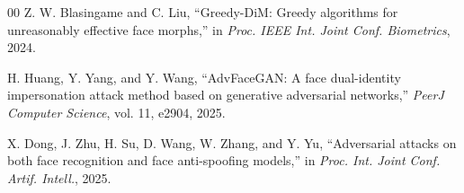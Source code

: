 \documentclass[conference]{IEEEtran}
\begin{document}
\begin{thebibliography}{00}
 Z. W. Blasingame and C. Liu, ``Greedy-DiM: Greedy
algorithms for unreasonably effective face morphs,'' in \emph{Proc. IEEE Int.
Joint Conf. Biometrics}, 2024.

 H. Huang, Y. Yang, and Y. Wang, ``AdvFaceGAN: A face
dual-identity impersonation attack method based on generative adversarial
networks,'' \emph{PeerJ Computer Science}, vol. 11, e2904, 2025.

 X. Dong, J. Zhu, H. Su, D. Wang, W. Zhang, and Y. Yu,
``Adversarial attacks on both face recognition and face anti-spoofing models,''
in \emph{Proc. Int. Joint Conf. Artif. Intell.}, 2025.
\end{thebibliography}
\end{document}
